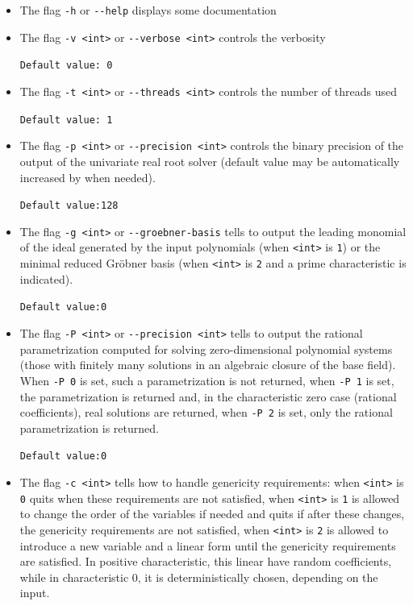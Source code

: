 \documentclass[a4paper,english,11pt]{scrartcl}
\theoremstyle{definition}
\theoremstyle{remark}
\begin{document}
\begin{itemize}
\item The flag \verb+-h+ or \verb+--help+ displays some documentation

\item The flag \verb+-v <int>+ or \verb+--verbose <int>+ controls the verbosity

  \hfill \verb+Default value: 0+

\item The flag \verb+-t <int>+ or \verb+--threads <int>+
  controls the number of threads used

  \hfill \verb+Default value: 1+

\item The flag \verb+-p <int>+ or \verb+--precision <int>+ controls the binary
  precision of the output of the
  univariate real root
  solver (default value may be automatically increased by \msolve when needed).
  
  \hfill \verb+Default value:128+
\item The flag \verb+-g <int>+ or \verb+--groebner-basis+ tells \msolve to output
  the leading monomial of
  the ideal generated by the input polynomials (when \verb+<int>+ is \verb+1+)
  or the minimal reduced Gr\"obner basis (when \verb+<int>+ is \verb+2+ and
  a prime characteristic is indicated).
  
  \hfill \verb+Default value:0+

\item The flag \verb+-P <int>+ or \verb+--precision <int>+ tells \msolve to output the
  rational parametrization computed for solving zero-dimensional polynomial
  systems (those with finitely many solutions in an algebraic closure of the base field).
  When \verb+-P 0+ is set, such a parametrization is not returned, when \verb+-P 1+ is
  set, the parametrization is returned and, in the characteristic zero case (rational
  coefficients), real solutions are returned, when \verb+-P 2+ is set, only the
  rational parametrization is returned.
  
  \hfill \verb+Default value:0+


\item The flag \verb+-c <int>+ tells \msolve how to handle genericity
  requirements: when \verb+<int>+ is \verb+0+ \msolve quits when these
  requirements are not satisfied, when \verb+<int>+ is \verb+1+ \msolve is
  allowed to change the order of the variables if needed and quits if after
  these changes, the genericity requirements are not satisfied,  when
  \verb+<int>+ is \verb+2+ \msolve is allowed to introduce a new variable and a
  linear form until the genericity requirements are satisfied. In
  positive characteristic, this linear have random coefficients, while
  in characteristic $0$, it is deterministically chosen, depending on
  the input.


\end{itemize}
\end{document}
